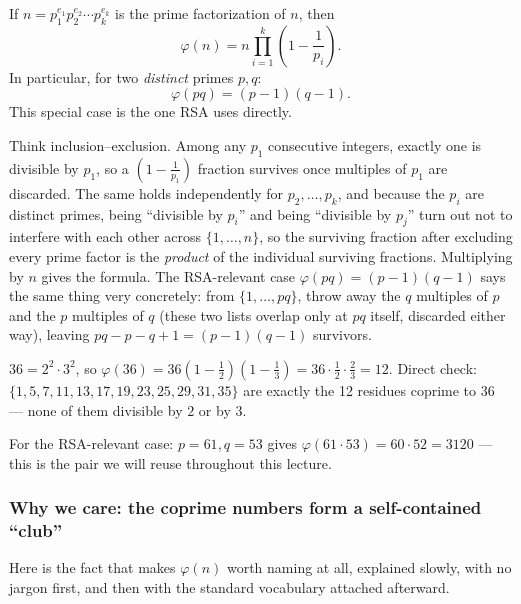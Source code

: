 \begin{proposition}\label{prop:totient}
If $n = p_1^{e_1} p_2^{e_2} \cdots p_k^{e_k}$ is the prime factorization of $n$, then
\[
\varphi(n) = n \prod_{i=1}^{k}\left(1 - \frac{1}{p_i}\right).
\]
In particular, for two \emph{distinct} primes $p, q$:
\[
\varphi(pq) = (p-1)(q-1).
\]
This special case is the one RSA uses directly.
\end{proposition}

\begin{remark}
Think inclusion--exclusion. Among any $p_1$ consecutive integers, exactly one is divisible by $p_1$, so a $\left(1-\frac1{p_1}\right)$ fraction survives once multiples of $p_1$ are discarded. The same holds independently for $p_2,\dots,p_k$, and because the $p_i$ are distinct primes, being ``divisible by $p_i$'' and being ``divisible by $p_j$'' turn out not to interfere with each other across $\{1,\dots,n\}$, so the surviving fraction after excluding every prime factor is the \emph{product} of the individual surviving fractions. Multiplying by $n$ gives the formula. The RSA-relevant case $\varphi(pq)=(p-1)(q-1)$ says the same thing very concretely: from $\{1,\dots,pq\}$, throw away the $q$ multiples of $p$ and the $p$ multiples of $q$ (these two lists overlap only at $pq$ itself, discarded either way), leaving $pq-p-q+1=(p-1)(q-1)$ survivors.
\end{remark}

\begin{example}
$36 = 2^2 \cdot 3^2$, so $\varphi(36) = 36\left(1 - \frac12\right)\left(1 - \frac13\right) = 36 \cdot \frac12 \cdot \frac23 = 12$. Direct check: $\{1,5,7,11,13,17,19,23,25,29,31,35\}$ are exactly the 12 residues coprime to 36 — none of them divisible by $2$ or by $3$.

For the RSA-relevant case: $p=61, q=53$ gives $\varphi(61 \cdot 53) = 60 \cdot 52 = 3120$ — this is the pair we will reuse throughout this lecture.
\end{example}

\subsubsection*{Why we care: the coprime numbers form a self-contained ``club''}

Here is the fact that makes $\varphi(n)$ worth naming at all, explained slowly, with no jargon first, and then with the standard vocabulary attached afterward.

